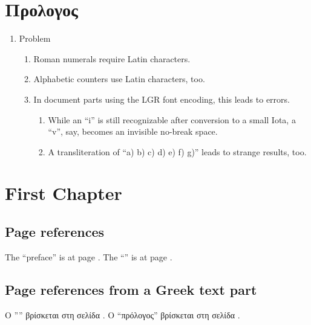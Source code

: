 \documentclass[a4paper,oneside]{book}
\begin{document}
\chapter{Προλογος \label{ch:prologos}}

\begin{enumerate}
  \item Problem
  \begin{enumerate}
    \item Roman numerals require Latin characters.
    \item Alphabetic counters use Latin characters, too.
    \item
      In document parts using the LGR font encoding, this leads to errors.
    \begin{enumerate}
      \item While an ``i'' is still recognizable after conversion to a
            small Iota, a ``v'', say, becomes an invisible no-break space.
      \item A transliteration of ``a) b) c) d) e) f) g)''
            leads to strange results, too.%
	    \label{item with roman number greek}
    \end{enumerate}
  \end{enumerate}
\end{enumerate}




\mainmatter

\chapter{First Chapter \label{ch:1}}

\section{Page references}

The ``preface'' is at page \pageref{ch:preface}.
The ``'' is at page \pageref{ch:prologos}.

\section{Page references from a Greek text part}


Ο '''' βρίσκεται στη σελίδα
 \pageref{ch:preface}.
Ο ``πρόλογος'' βρίσκεται στη σελίδα \pageref{ch:prologos}.
\end{document}
